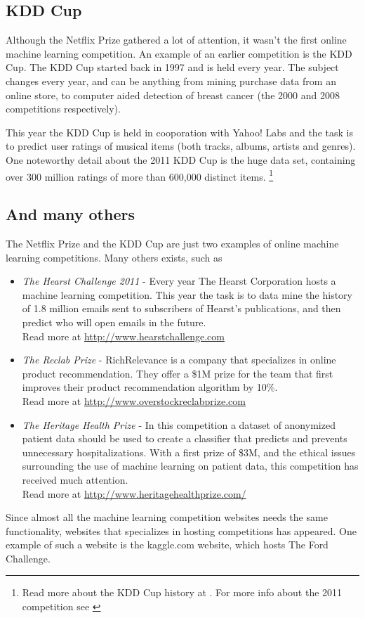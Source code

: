 \subsection{KDD Cup}
Although the Netflix Prize gathered a lot of attention, it wasn't the first online machine learning competition. An example of an earlier competition is the KDD Cup. The KDD Cup started back in 1997 and is held every year. The subject changes every year, and can be anything from mining purchase data from an online store, to computer aided detection of breast cancer (the 2000 and 2008 competitions respectively).\par
This year the KDD Cup is held in cooporation with Yahoo! Labs and the task is to predict user ratings of musical items (both tracks, albums, artists and genres). One noteworthy detail about the 2011 KDD Cup is the huge data set, containing over 300 million ratings of more than 600,000 distinct items. \footnote{Read more about the KDD Cup history at \citet{kdd_cup_center}. For more info about the 2011 competition see \citet{kdd_cup_2011}}

\subsection{And many others}
The Netflix Prize and the KDD Cup are just two examples of online machine learning competitions. Many others exists, such as
\begin{itemize}
    \item \emph{The Hearst Challenge 2011} - Every year The Hearst Corporation hosts a machine learning competition. This year the task is to data mine the history of 1.8 million emails sent to subscribers of Hearst's publications, and then predict who will open emails in the future. \\
        Read more at \url{http://www.hearstchallenge.com}
    \item \emph{The Reclab Prize} - RichRelevance is a company that specializes in online product recommendation. They offer a \$1M prize for the team that first improves their product recommendation algorithm by 10\%. \\
        Read more at \url{http://www.overstockreclabprize.com}
    \item \emph{The Heritage Health Prize} - In this competition a dataset of anonymized patient data should be used to create a classifier that predicts and prevents unnecessary hospitalizations. With a first prize of \$3M, and the ethical issues surrounding the use of machine learning on patient data, this competition has received much attention.  \\
        Read more at \url{http://www.heritagehealthprize.com/}
\end{itemize}
Since almost all the machine learning competition websites needs the same functionality, websites that specializes in hosting competitions has appeared. One example of such a website is the kaggle.com website, which hosts The Ford Challenge.

